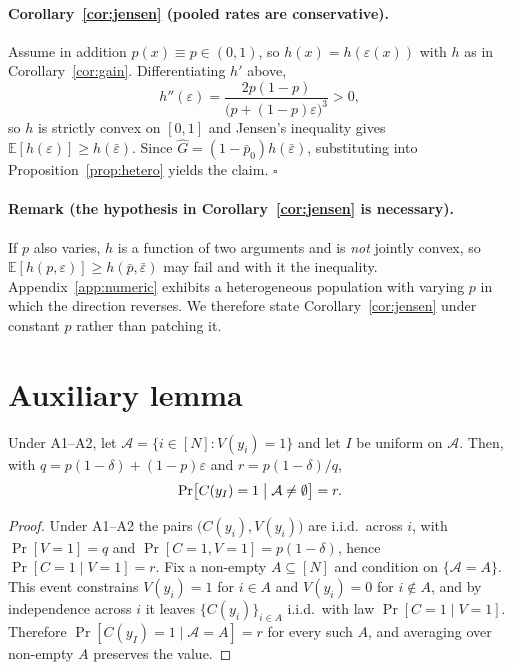 \documentclass[11pt]{article}
\begin{document}
\paragraph{Corollary~\ref{cor:jensen} (pooled rates are conservative).}
Assume in addition $p(x)\equiv p\in(0,1)$, so $h(x)=h(\varepsilon(x))$ with $h$ as in Corollary~\ref{cor:gain}. Differentiating $h'$ above,
\[h''(\varepsilon)=\frac{2p(1-p)}{\bigl(p+(1-p)\varepsilon\bigr)^{3}}>0 ,\]
so $h$ is strictly convex on $[0,1]$ and Jensen's inequality gives $\mathbb{E}[h(\varepsilon)]\ge h(\bar\varepsilon)$. Since $\widehat G=(1-\bar p_0)h(\bar\varepsilon)$, substituting into Proposition~\ref{prop:hetero} yields the claim. \hfill$\square$

\paragraph{Remark (the hypothesis in Corollary~\ref{cor:jensen} is necessary).}
If $p$ also varies, $h$ is a function of two arguments and is \emph{not} jointly convex, so $\mathbb{E}[h(p,\varepsilon)]\ge h(\bar p,\bar\varepsilon)$ may fail and with it the inequality. Appendix~\ref{app:numeric} exhibits a heterogeneous population with varying $p$ in which the direction reverses. We therefore state Corollary~\ref{cor:jensen} under constant $p$ rather than patching it.

\section{Auxiliary lemma}\label{app:lemma}
\begin{lemma}\label{lem:precision}
Under A1--A2, let $\mathcal{A}=\{i\in[N]:V(y_i)=1\}$ and let $I$ be uniform on $\mathcal{A}$. Then, with $q=p(1-\delta)+(1-p)\varepsilon$ and $r=p(1-\delta)/q$,
\[\Pr\bigl[C(y_I)=1 \bigm| \mathcal{A}\neq\emptyset\bigr]=r .\]
\end{lemma}
\begin{proof}
Under A1--A2 the pairs $\bigl(C(y_i),V(y_i)\bigr)$ are i.i.d.\ across $i$, with $\Pr[V{=}1]=q$ and $\Pr[C{=}1,V{=}1]=p(1-\delta)$, hence $\Pr[C{=}1\mid V{=}1]=r$. Fix a non-empty $A\subseteq[N]$ and condition on $\{\mathcal{A}=A\}$. This event constrains $V(y_i)=1$ for $i\in A$ and $V(y_i)=0$ for $i\notin A$, and by independence across $i$ it leaves $\{C(y_i)\}_{i\in A}$ i.i.d.\ with law $\Pr[C{=}1\mid V{=}1]$. Therefore $\Pr[C(y_I){=}1\mid\mathcal{A}=A]=r$ for every such $A$, and averaging over non-empty $A$ preserves the value.
\end{proof}
\end{document}
